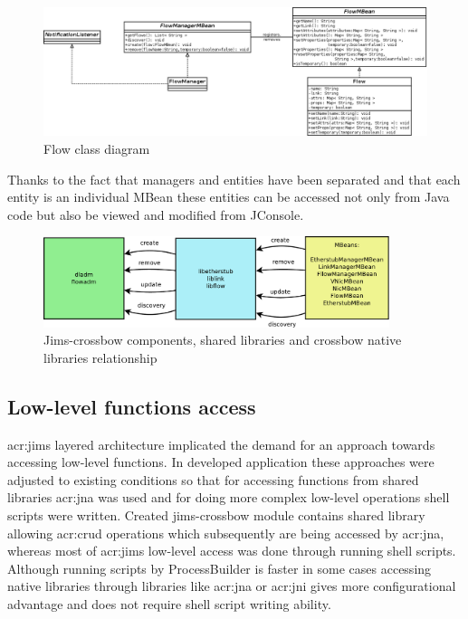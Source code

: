 \documentclass[11pt,openany]{book}
\begin{document}
        \begin{figure}[H]
          \centering
          \includegraphics[width=1.2\textwidth, angle=90]{img/impl/flow.png}

          \caption{Flow class diagram}
        \end{figure}        

        Thanks to the fact that managers and entities have been separated and that each entity is an individual MBean
        these entities can be accessed not only from Java code but also be viewed and modified from JConsole.


        \begin{figure}[H]
          \centering
          \includegraphics[width=0.9\textwidth]{img/impl/crossbowLibsDiagram.pdf}

          \caption{Jims-crossbow components, shared libraries and crossbow native libraries relationship}
          \label{fig:impl:jc-components}
        \end{figure} 
		

      \subsection{Low-level functions access}
      \label{sec:impl:low}

        \gls{acr:jims} layered architecture implicated  the demand for an approach towards accessing low-level functions.
        In developed application these approaches were adjusted to existing conditions so that for accessing functions
        from shared libraries \gls{acr:jna} was used and for doing more complex low-level operations shell scripts were
        written. Created jims-crossbow module contains shared library allowing
        \gls{acr:crud} operations which subsequently are being accessed by \gls{acr:jna}, whereas most of \gls{acr:jims}
        low-level access was done through running shell scripts. Although running scripts by ProcessBuilder is faster in
        some cases  accessing native libraries through libraries like \gls{acr:jna} or \gls{acr:jni} gives more
        configurational advantage and does not require shell script writing ability.
\end{document}
